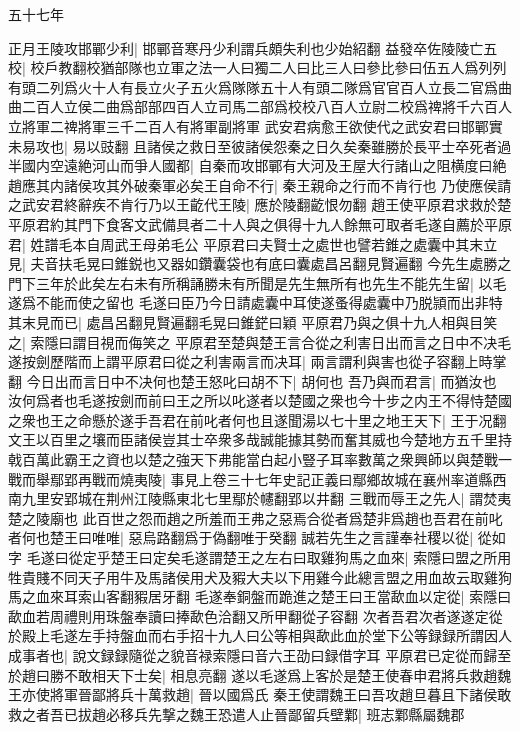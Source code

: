 五十七年

正月王陵攻邯鄲少利|{
	邯鄲音寒丹少利謂兵頗失利也少始紹翻}
益發卒佐陵陵亡五校|{
	校戶教翻校猶部隊也立軍之法一人曰獨二人曰比三人曰參比參曰伍五人爲列列有頭二列爲火十人有長立火子五火爲隊隊五十人有頭二隊爲官官百人立長二官爲曲曲二百人立侯二曲爲部部四百人立司馬二部爲校校八百人立尉二校爲禆將千六百人立將軍二禆將軍三千二百人有將軍副將軍}
武安君病愈王欲使代之武安君曰邯鄲實未易攻也|{
	易以豉翻}
且諸侯之救日至彼諸侯怨秦之日久矣秦雖勝於長平士卒死者過半國内空遠絶河山而爭人國都|{
	自秦而攻邯鄲有大河及王屋大行諸山之阻横度曰絶}
趙應其内諸侯攻其外破秦軍必矣王自命不行|{
	秦王親命之行而不肯行也}
乃使應侯請之武安君終辭疾不肯行乃以王齕代王陵|{
	應於陵翻齕恨勿翻}
趙王使平原君求救於楚平原君約其門下食客文武備具者二十人與之俱得十九人餘無可取者毛遂自薦於平原君|{
	姓譜毛本自周武王母弟毛公}
平原君曰夫賢士之處世也譬若錐之處囊中其末立見|{
	夫音扶毛晃曰錐鋭也又器如鑽囊袋也有底曰囊處昌呂翻見賢遍翻}
今先生處勝之門下三年於此矣左右未有所稱誦勝未有所聞是先生無所有也先生不能先生留|{
	以毛遂爲不能而使之留也}
毛遂曰臣乃今日請處囊中耳使遂蚤得處囊中乃脱頴而出非特其末見而已|{
	處昌呂翻見賢遍翻毛晃曰錐鋩曰穎}
平原君乃與之俱十九人相與目笑之|{
	索隱曰謂目視而侮笑之}
平原君至楚與楚王言合從之利害日出而言之日中不决毛遂按劍歷階而上謂平原君曰從之利害兩言而决耳|{
	兩言謂利與害也從子容翻上時掌翻}
今日出而言日中不决何也楚王怒叱曰胡不下|{
	胡何也}
吾乃與而君言|{
	而猶汝也}
汝何爲者也毛遂按劍而前曰王之所以叱遂者以楚國之衆也今十步之内王不得恃楚國之衆也王之命懸於遂手吾君在前叱者何也且遂聞湯以七十里之地王天下|{
	王于况翻}
文王以百里之壤而臣諸侯豈其士卒衆多哉誠能據其勢而奮其威也今楚地方五千里持戟百萬此霸王之資也以楚之強天下弗能當白起小豎子耳率數萬之衆興師以與楚戰一戰而舉鄢郢再戰而燒夷陵|{
	事見上卷三十七年史記正義曰鄢鄉故城在襄州率道縣西南九里安郢城在荆州江陵縣東北七里鄢於幰翻郢以井翻}
三戰而辱王之先人|{
	謂焚夷楚之陵廟也}
此百世之怨而趙之所羞而王弗之惡焉合從者爲楚非爲趙也吾君在前叱者何也楚王曰唯唯|{
	惡烏路翻爲于偽翻唯于癸翻}
誠若先生之言謹奉社稷以從|{
	從如字}
毛遂曰從定乎楚王曰定矣毛遂謂楚王之左右曰取雞狗馬之血來|{
	索隱曰盟之所用牲貴賤不同天子用牛及馬諸侯用犬及豭大夫以下用雞今此總言盟之用血故云取雞狗馬之血來耳索山客翻豭居牙翻}
毛遂奉銅盤而跪進之楚王曰王當歃血以定從|{
	索隱曰歃血若周禮則用珠盤奉讀曰捧歃色洽翻又所甲翻從子容翻}
次者吾君次者遂遂定從於殿上毛遂左手持盤血而右手招十九人曰公等相與歃此血於堂下公等録録所謂因人成事者也|{
	說文録録隨從之貌音禄索隱曰音六王劭曰録借字耳}
平原君已定從而歸至於趙曰勝不敢相天下士矣|{
	相息亮翻}
遂以毛遂爲上客於是楚王使春申君將兵救趙魏王亦使將軍晉鄙將兵十萬救趙|{
	晉以國爲氏}
秦王使謂魏王曰吾攻趙旦暮且下諸侯敢救之者吾已拔趙必移兵先撃之魏王恐遣人止晉鄙留兵壁鄴|{
	班志鄴縣屬魏郡}
